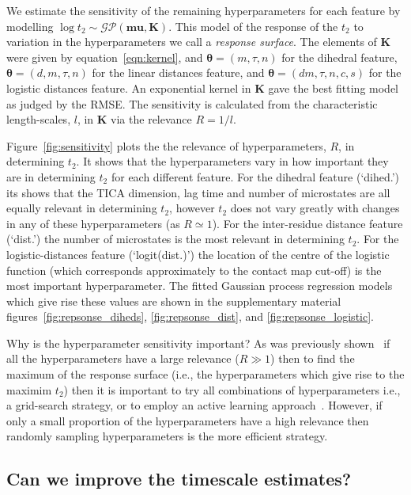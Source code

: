 \documentclass[journal=jacsat,manuscript=article]{achemso}
\begin{document}
We estimate the sensitivity of the remaining hyperparameters for each feature by modelling $\log{t_{2}} \sim \mathcal{GP}(\bm{mu}, \mathbf{K})$. This model of the response of the $t_2$ to variation in the hyperparameters we call a \emph{response surface}. The elements of $\mathbf{K}$ were given by equation~\ref{eqn:kernel}, and $\bm{\theta} = (m, \tau, n)$  for the dihedral feature,  $\bm{\theta} = (d, m, \tau, n)$ for the linear distances feature, and $\bm{\theta} = (d m, \tau, n, c, s)$  for the logistic distances feature. An exponential kernel in $\mathbf{K}$ gave the best fitting model as judged by the RMSE. The sensitivity is calculated from the characteristic length-scales, $l$, in $\mathbf{K}$ via the relevance $R=1/l$.  

Figure~\ref{fig:sensitivity} plots the  the relevance of hyperparameters, $R$, in determining $t_{2}$. It shows that the hyperparameters vary in how important they are in determining $t_2$ for each different feature.  For the dihedral feature (`dihed.') its shows that the TICA dimension, lag time and number of microstates are all equally relevant in determining $t_2$, however $t_2$ does not vary greatly with changes in any of these hyperparameters (as $R\simeq 1$). For the inter-residue distance feature (`dist.') the number of microstates is the most relevant in determining $t_2$. For the logistic-distances feature (`logit(dist.)') the location of the centre of the logistic function (which corresponds approximately to the contact map cut-off) is the most important hyperparameter. The fitted Gaussian process regression models which give rise these values are shown in the supplementary material figures~\ref{fig:repsonse_diheds}, \ref{fig:repsonse_dist}, and \ref{fig:repsonse_logistic}. 

Why is the hyperparameter sensitivity important? As was previously shown~\cite{bergstra_jamesbergstra_random_2012} if all the hyperparameters have a large relevance ($R \gg 1$) then to find the maximum of the response surface (i.e., the hyperparameters which give rise to the maximim $t_2$) then it is important to try all combinations of hyperparameters i.e., a  grid-search strategy, or to employ an active learning approach~\cite{snoekAbstractBayesianOptimization2013}.  However, if only a small proportion of the hyperparameters have a high relevance then randomly sampling hyperparameters is the more efficient strategy. 

\subsection{Can we improve the timescale estimates?}
\end{document}
